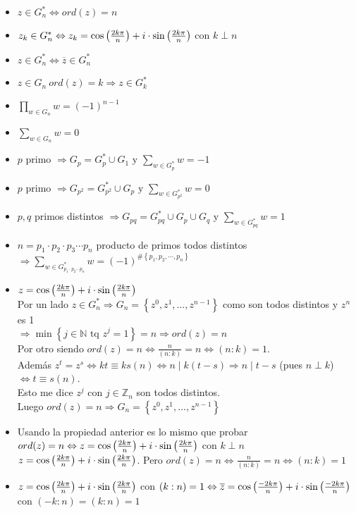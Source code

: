 \documentclass[a4paper,10pt]{article}
\begin{document}
\propiedades 
\begin{itemize}
	\item $z \in G_{n}^{*} \Leftrightarrow ord(z)=n$
	\item $z_k \in G_{n}^{*} \Leftrightarrow z_k = \cos \left( \frac{2k\pi}{n} \right) + i \cdot \sin \left( \frac{2k\pi}{n} \right)$ con $k \perp n$
	\item $z \in G_{n}^{*} \Leftrightarrow \overline{z} \in G_{n}^{*}$
	\item $z \in G_{n} \ ord(z)=k \Rightarrow z \in G_k^{*}$
	\item $\displaystyle \prod_{w \in G_{n}} {w} = (-1)^{n-1}$
	\item $\displaystyle \sum_{w \in G_{n}} {w} = 0$ 
	\item $p$ primo $\Rightarrow G_p = G_{p}^{*} \cup G_1 \mbox{ y } \displaystyle \sum_{w \in G_{p}^{*}} {w} = -1$
	\item $p$ primo $\Rightarrow G_{p^{2}} = G_{{p}^{2}}^{*} \cup G_{p} \mbox{ y } \displaystyle \sum_{w \in G_{{p}^{2}}^{*}} {w} = 0$
	\item $p,q$ primos distintos $\Rightarrow G_{pq} = G_{pq}^{*} \cup G_{p} \cup G_{q} \mbox{ y } \displaystyle \sum_{w \in G_{pq}^{*}} {w} = 1$
	\item $n=p_1 \cdot p_2 \cdot p_3 \cdots p_n$ producto de primos todos distintos $\Rightarrow \displaystyle \sum_{w \in G_{p_1 \cdot p_2 \cdots p_n}^{*}} {w} = (-1)^{\#\left\lbrace p_1,p_2, \cdots,p_n \right\rbrace}$ 
	
\end{itemize}

\ifversionlarga
\begin{demo}
	\begin{itemize} 
		\item $z = \cos \left( \frac{2k\pi}{n} \right) + i \cdot \sin \left( \frac{2k\pi}{n} \right)$ \\
		Por un lado $z \in G_{n}^{*} \Rightarrow G_{n} = \left\lbrace z^{0},z^{1},\dots,z^{n-1} \right\rbrace$ como son todos distintos y $z^{n}$ es 1 \\ $\Rightarrow \min \left\lbrace j \in \mathbb{N} \mbox{ tq } z^{j} = 1 \right\rbrace = n \Rightarrow ord(z)=n$ \\
		Por otro siendo $ord(z)=n \Leftrightarrow \frac{n}{(n:k)} = n \Leftrightarrow (n:k)=1$. \\ Además $z^{t}=z^{s} \Leftrightarrow kt \equiv ks (n) \Leftrightarrow n \mid {k(t-s)} \Rightarrow n \mid t-s$ (pues $n \perp k$) $\Leftrightarrow t \equiv s (n)$. \\ Esto me dice $z^{j}$ con $j \in \mathbb{Z}_{n}$ son todos distintos. \\ Luego $ord(z)=n \Rightarrow G_{n} = \left\lbrace z^{0},z^{1},\dots,z^{n-1} \right\rbrace$
		\item Usando la propiedad anterior es lo mismo que probar $ord(z)=n \Leftrightarrow z = \cos \left( \frac{2k\pi}{n} \right) + i \cdot \sin \left( \frac{2k\pi}{n} \right)$ con $k \perp n$ \\
		$z = \cos \left( \frac{2k\pi}{n} \right) + i \cdot \sin \left( \frac{2k\pi}{n} \right)$. Pero $ord(z)=n \Leftrightarrow \frac{n}{(n:k)} = n \Leftrightarrow (n:k)=1$
		\item $z = \cos \left( \frac{2k\pi}{n} \right) + i \cdot \sin \left( \frac{2k\pi}{n} \right)$ con $(k:n)=1 \Leftrightarrow \overline{z} = \cos \left( \frac{-2k\pi}{n} \right) + i \cdot \sin \left( \frac{-2k\pi}{n} \right)$ con $(-k:n)=(k:n)=1$
		
	\end{itemize}
\end{demo}
\fi
\end{document}
